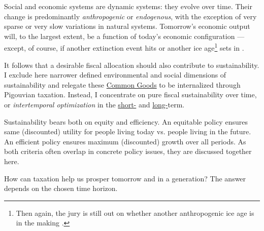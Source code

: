 

Social and economic systems are dynamic systems: they evolve over time. Their change is predominantly \emph{anthropogenic} or \emph{endogenous}, with the exception of very sparse or very slow variations in natural systems. Tomorrow's economic output will, to the largest extent, be a function of today's economic 
configuration --- except, of course, if another extinction event hits or another ice age\footnote{
	Then again, the jury is still out on whether another anthropogenic ice age is in the making \citep{UnitedNations2007, Rahmsdorf-2009}.} 
sets in \citep{Courtillot2002}.

It follows that a desirable fiscal allocation should also contribute to sustainability. I exclude here narrower defined environmental and social dimensions of sustainability and relegate these \hyperref[CommonGIcood]{Common Goods} to be internalized through Pigouvian taxation. Instead, I concentrate on pure fiscal sustainability over time, or \emph{intertemporal optimization} in the \hyperref[ShortTermSmoothing]{short-} and \hyperref[LongTermSmoothing]{long-}term. 

Sustainability bears both on equity and efficiency. An equitable policy ensures same (discounted) utility for people living today vs. people living in the future. An efficient policy ensures maximum (discounted) growth over all periods. As both criteria often overlap in concrete policy issues, they are discussed together here.

How can taxation help us prosper tomorrow and in a generation? The answer depends on the chosen time horizon.


